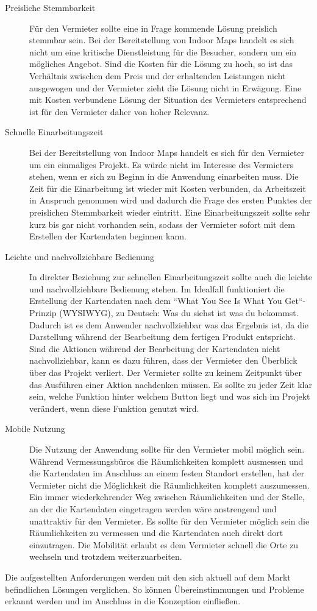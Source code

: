 \begin{description}
	\item[Preisliche Stemmbarkeit]
	Für den Vermieter sollte eine in Frage kommende Lösung preislich stemmbar sein.
	Bei der Bereitstellung von Indoor Maps handelt es sich nicht um eine kritische Dienstleistung für die Besucher, sondern um ein mögliches Angebot.
	Sind die Kosten für die Lösung zu hoch, so ist das Verhältnis zwischen dem Preis und der erhaltenden Leistungen nicht ausgewogen und der Vermieter zieht die Lösung nicht in Erwägung.\pbreak%
	Eine mit Kosten verbundene Lösung der Situation des Vermieters entsprechend ist für den Vermieter daher von hoher Relevanz.
	\item[Schnelle Einarbeitungszeit]
	Bei der Bereitstellung von Indoor Maps handelt es sich für den Vermieter um ein einmaliges Projekt.
	Es würde nicht im Interesse des Vermieters stehen, wenn er sich zu Beginn in die Anwendung einarbeiten muss.
	Die Zeit für die Einarbeitung ist wieder mit Kosten verbunden, da Arbeitszeit in Anspruch genommen wird und dadurch die Frage des ersten Punktes der preislichen Stemmbarkeit wieder eintritt.\pbreak%
	Eine Einarbeitungszeit sollte sehr kurz bis gar nicht vorhanden sein, sodass der Vermieter sofort mit dem Erstellen der Kartendaten beginnen kann.
	\item[Leichte und nachvollziehbare Bedienung]
	In direkter Beziehung zur schnellen Einarbeitungszeit sollte auch die leichte und nachvollziehbare Bedienung stehen.
	Im Idealfall funktioniert die Erstellung der Kartendaten nach dem ``What You See Is What You Get``-Prinzip (WYSIWYG), zu Deutsch: Was du siehst ist was du bekommst.
	Dadurch ist es dem Anwender nachvollziehbar was das Ergebnis ist, da die Darstellung während der Bearbeitung dem fertigen Produkt entspricht.
	Sind die Aktionen während der Bearbeitung der Kartendaten nicht nachvollziehbar, kann es dazu führen, dass der Vermieter den Überblick über das Projekt verliert.\pbreak%
	Der Vermieter sollte zu keinem Zeitpunkt über das Ausführen einer Aktion nachdenken müssen.
	Es sollte zu jeder Zeit klar sein, welche Funktion hinter welchem Button liegt und was sich im Projekt verändert, wenn diese Funktion genutzt wird.
	\item[Mobile Nutzung]
	Die Nutzung der Anwendung sollte für den Vermieter mobil möglich sein.
	Während Vermessungsbüros die Räumlichkeiten komplett ausmessen und die Kartendaten im Anschluss an einem festen Standort erstellen, hat der Vermieter nicht die Möglichkeit die Räumlichkeiten komplett auszumessen.
	Ein immer wiederkehrender Weg zwischen Räumlichkeiten und der Stelle, an der die Kartendaten eingetragen werden wäre anstrengend und unattraktiv für den Vermieter.\pbreak%
	Es sollte für den Vermieter möglich sein die Räumlichkeiten zu vermessen und die Kartendaten auch direkt dort einzutragen.
	Die Mobilität erlaubt es dem Vermieter schnell die Orte zu wechseln und trotzdem weiterzuarbeiten.\pagebreak
\end{description}
Die aufgestellten Anforderungen werden mit den sich aktuell auf dem Markt befindlichen Lösungen verglichen.
So können Übereinstimmungen und Probleme erkannt werden und im Anschluss in die Konzeption einfließen.

